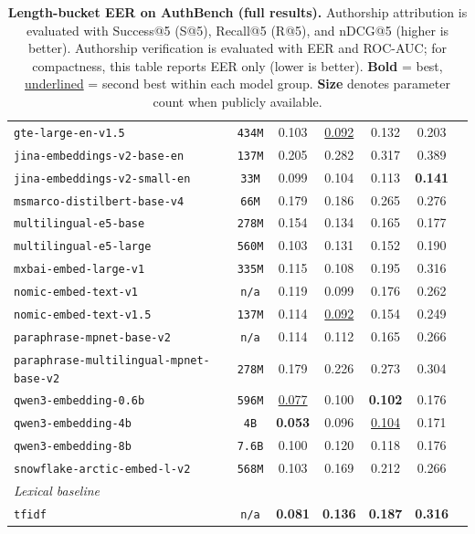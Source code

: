 \documentclass{article}
\newcommand{\rev}[1]{#1}
\begin{document}
\begin{table}[htbp]
{\begin{tabular}{lcccccc}
\texttt{gte-large-en-v1.5} & \texttt{434M} & 0.103 & \underline{0.092} & 0.132 & 0.203 \\
\texttt{jina-embeddings-v2-base-en} & \texttt{137M} & 0.205 & 0.282 & 0.317 & 0.389 \\
\texttt{jina-embeddings-v2-small-en} & \texttt{33M} & 0.099 & 0.104 & 0.113 & \textbf{0.141} \\
\texttt{msmarco-distilbert-base-v4} & \texttt{66M} & 0.179 & 0.186 & 0.265 & 0.276 \\
\texttt{multilingual-e5-base} & \texttt{278M} & 0.154 & 0.134 & 0.165 & 0.177 \\
\texttt{multilingual-e5-large} & \texttt{560M} & 0.103 & 0.131 & 0.152 & 0.190 \\
\texttt{mxbai-embed-large-v1} & \texttt{335M} & 0.115 & 0.108 & 0.195 & 0.316 \\
\texttt{nomic-embed-text-v1} & \texttt{n/a} & 0.119 & 0.099 & 0.176 & 0.262 \\
\texttt{nomic-embed-text-v1.5} & \texttt{137M} & 0.114 & \underline{0.092} & 0.154 & 0.249 \\
\texttt{paraphrase-mpnet-base-v2} & \texttt{n/a} & 0.114 & 0.112 & 0.165 & 0.266 \\
\texttt{paraphrase-multilingual-mpnet-base-v2} & \texttt{278M} & 0.179 & 0.226 & 0.273 & 0.304 \\
\texttt{qwen3-embedding-0.6b} & \texttt{596M} & \underline{0.077} & 0.100 & \textbf{0.102} & 0.176 \\
\texttt{qwen3-embedding-4b} & \texttt{4B} & \textbf{0.053} & 0.096 & \underline{0.104} & 0.171 \\
\texttt{qwen3-embedding-8b} & \texttt{7.6B} & 0.100 & 0.120 & 0.118 & 0.176 \\
\texttt{snowflake-arctic-embed-l-v2} & \texttt{568M} & 0.103 & 0.169 & 0.212 & 0.266 \\
\midrule
\multicolumn{6}{l}{\textit{Lexical baseline}} \\
\midrule
\texttt{tfidf} & \texttt{n/a} & \textbf{0.081} & \textbf{0.136} & \textbf{0.187} & \textbf{0.316} \\
\bottomrule
\end{tabular}
}
\caption{\textbf{Length-bucket EER on AuthBench (full results).} Authorship attribution is evaluated with Success@5 (S@5), Recall@5 (R@5), and nDCG@5 (higher is better). \rev{Authorship verification is evaluated with EER and ROC-AUC; for compactness, this table reports EER only (lower is better).} \textbf{Bold} = best, \underline{underlined} = second best within each model group. \textbf{Size} denotes parameter count when publicly available.}
\label{tab:length-eer5-full}
\end{table}
\end{document}
